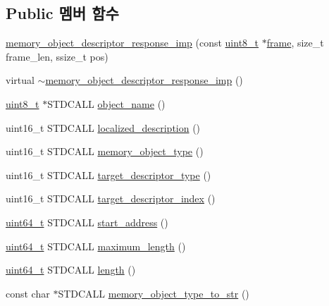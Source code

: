 \subsection*{Public 멤버 함수}
\begin{DoxyCompactItemize}
\item 
\hyperlink{classavdecc__lib_1_1memory__object__descriptor__response__imp_a4ad71aebbf6479970f7f04dfeb170448}{memory\+\_\+object\+\_\+descriptor\+\_\+response\+\_\+imp} (const \hyperlink{stdint_8h_aba7bc1797add20fe3efdf37ced1182c5}{uint8\+\_\+t} $\ast$\hyperlink{gst__avb__playbin_8c_ac8e710e0b5e994c0545d75d69868c6f0}{frame}, size\+\_\+t frame\+\_\+len, ssize\+\_\+t pos)
\item 
virtual \hyperlink{classavdecc__lib_1_1memory__object__descriptor__response__imp_a63e5e77363b61b7d10c209aeef53b395}{$\sim$memory\+\_\+object\+\_\+descriptor\+\_\+response\+\_\+imp} ()
\item 
\hyperlink{stdint_8h_aba7bc1797add20fe3efdf37ced1182c5}{uint8\+\_\+t} $\ast$S\+T\+D\+C\+A\+LL \hyperlink{classavdecc__lib_1_1memory__object__descriptor__response__imp_a15837e3eb254ad44812cb766ae8cd53c}{object\+\_\+name} ()
\item 
uint16\+\_\+t S\+T\+D\+C\+A\+LL \hyperlink{classavdecc__lib_1_1memory__object__descriptor__response__imp_aa94307532fbb37e2f986fee8fec79373}{localized\+\_\+description} ()
\item 
uint16\+\_\+t S\+T\+D\+C\+A\+LL \hyperlink{classavdecc__lib_1_1memory__object__descriptor__response__imp_a4c7518806ae5115cfe8f20201078275d}{memory\+\_\+object\+\_\+type} ()
\item 
uint16\+\_\+t S\+T\+D\+C\+A\+LL \hyperlink{classavdecc__lib_1_1memory__object__descriptor__response__imp_a32b36b251c3d7e7b15be6c6b9daa7e5d}{target\+\_\+descriptor\+\_\+type} ()
\item 
uint16\+\_\+t S\+T\+D\+C\+A\+LL \hyperlink{classavdecc__lib_1_1memory__object__descriptor__response__imp_a7134873442f81689f17391259b95f48a}{target\+\_\+descriptor\+\_\+index} ()
\item 
\hyperlink{parse_8c_aec6fcb673ff035718c238c8c9d544c47}{uint64\+\_\+t} S\+T\+D\+C\+A\+LL \hyperlink{classavdecc__lib_1_1memory__object__descriptor__response__imp_a36741c8d0833660ba24215fda346687c}{start\+\_\+address} ()
\item 
\hyperlink{parse_8c_aec6fcb673ff035718c238c8c9d544c47}{uint64\+\_\+t} S\+T\+D\+C\+A\+LL \hyperlink{classavdecc__lib_1_1memory__object__descriptor__response__imp_ab3cbbd3cbf2dbca88b3649a6a1515ac0}{maximum\+\_\+length} ()
\item 
\hyperlink{parse_8c_aec6fcb673ff035718c238c8c9d544c47}{uint64\+\_\+t} S\+T\+D\+C\+A\+LL \hyperlink{classavdecc__lib_1_1memory__object__descriptor__response__imp_a4480837abd78e6b441a28174fff0b2eb}{length} ()
\item 
const char $\ast$S\+T\+D\+C\+A\+LL \hyperlink{classavdecc__lib_1_1memory__object__descriptor__response__imp_a91d74def02b04d7ce4dd7c1a4d8037f8}{memory\+\_\+object\+\_\+type\+\_\+to\+\_\+str} ()
\end{DoxyCompactItemize}
